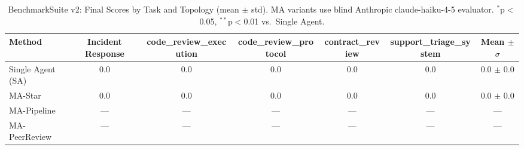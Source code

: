 \begin{table}[h]
\centering
\caption{BenchmarkSuite v2: Final Scores by Task and Topology (mean $\pm$ std). 
MA variants use blind Anthropic claude-haiku-4-5 evaluator. $^*$p$<$0.05, $^{**}$p$<$0.01 vs.\ Single Agent.}
\label{tab:benchmark_v2}
\begin{tabular}{lcccccc}
\toprule
Method & Incident Response & code_review_execution & code_review_protocol & contract_review & support_triage_system & Mean $\pm$ $\sigma$ \\
\midrule
Single Agent (SA) & 0.0 & 0.0 & 0.0 & 0.0 & 0.0 & 0.0 $\pm$ 0.0 \\
MA-Star & 0.0 & 0.0 & 0.0 & 0.0 & 0.0 & 0.0 $\pm$ 0.0 \\
MA-Pipeline & — & — & — & — & — & — \\
MA-PeerReview & — & — & — & — & — & — \\
\bottomrule
\end{tabular}
\end{table}
